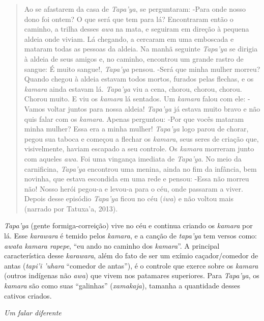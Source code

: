 \begin{quote}
Ao se afastarem da casa de \emph{Tapa'ya}, se perguntaram: -Para onde
nosso dono foi ontem? O que será que tem para lá? Encontraram então o
caminho, a trilha desses \emph{awa} na mata, e seguiram em direção à
pequena aldeia onde viviam. Lá chegando, a cercaram em uma emboscada e
mataram todas as pessoas da aldeia. Na manhã seguinte \emph{Tapa'ya} se
dirigia à aldeia de seus amigos e, no caminho, encontrou um grande
rastro de sangue: É muito sangue!, \emph{Tapa'ya} pensou. -Será que
minha mulher morreu? Quando chegou à aldeia estavam todos mortos,
furados pelas flechas, e os \emph{kamara} ainda estavam lá.
\emph{Tapa'ya} viu a cena, chorou, chorou, chorou. Chorou muito. E viu
os \emph{kamara} lá sentados. Um \emph{kamara} falou com ele: -Vamos
voltar juntos para nossa aldeia! \emph{Tapa'ya} já estava muito bravo e
não quis falar com os \emph{kamara}. Apenas perguntou: -Por que vocês
mataram minha mulher? Essa era a minha mulher! \emph{Tapa'ya} logo parou
de chorar, pegou sua taboca e começou a flechar os \emph{kamara}, seus
seres de criação que, visivelmente, haviam escapado a seu controle. Os
\emph{kamara} morreram junto com aqueles \emph{awa}. Foi uma vingança
imediata de \emph{Tapa'ya}. No meio da carnificina, \emph{Tapa'ya}
encontrou uma menina, ainda no fim da infância, bem novinha, que estava
escondida em uma rede e pensou: -Essa não morreu não! Nosso herói
pegou-a e levou-a para o céu, onde passaram a viver. Depois desse
episódio \emph{Tapa'ya} ficou no céu (\emph{iwa}) e não voltou mais
(narrado por Tatuxa'a, 2013).
\end{quote}

\emph{Tapa'ya} (gente formiga-correição) vive no céu e continua criando
os \emph{kamara} por lá. Esse \emph{karawara} é temido pelos
\emph{kamara}, e a canção de \emph{tapa'ya} tem versos como: \emph{awata
kamara rapepe}, ``eu ando no caminho dos \emph{kamara}''. A principal
característica desse \emph{karawara}, além do fato de ser um exímio
caçador/comedor de antas (\emph{tapi'i 'uhara} ``comedor de antas''), é
o controle que exerce sobre os \emph{kamara} (outros indígenas não
\emph{awa}) que vivem nos patamares superiores. Para \emph{Tapa'ya}, os
\emph{kamara} são como suas ``galinhas'' (\emph{xamakaja}), tamanha a
quantidade desses cativos criados.

\emph{Um falar diferente}

